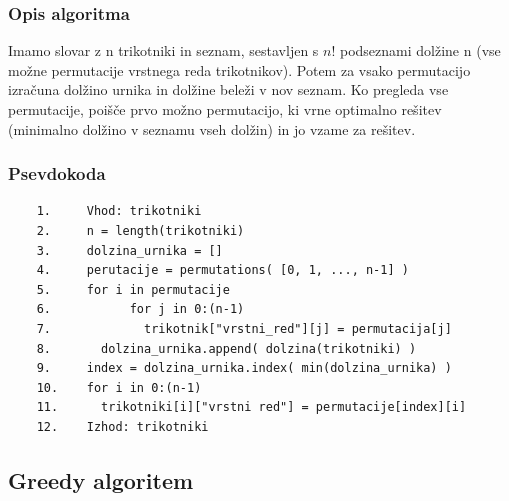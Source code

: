 \documentclass[a4paper,12pt]{article}
\theoremstyle{definition}
\theoremstyle{plain}
\begin{document}
\subsubsection{Opis algoritma}
Imamo slovar z n trikotniki in seznam, sestavljen s $n!$ podseznami dolžine n
(vse možne permutacije vrstnega reda trikotnikov). Potem za vsako permutacijo izračuna dolžino urnika in 
dolžine beleži v nov seznam. Ko pregleda vse permutacije, poišče prvo možno permutacijo, ki vrne optimalno rešitev
(minimalno dolžino v seznamu vseh dolžin) in jo vzame za rešitev.

\subsubsection{Psevdokoda}
\begin{verbatim}
    1.     Vhod: trikotniki
    2.     n = length(trikotniki)
    3.     dolzina_urnika = []
    4.     perutacije = permutations( [0, 1, ..., n-1] )
    5.     for i in permutacije
    6.           for j in 0:(n-1)
    7.             trikotnik["vrstni_red"][j] = permutacija[j]
    8.       dolzina_urnika.append( dolzina(trikotniki) )
    9.     index = dolzina_urnika.index( min(dolzina_urnika) )
    10.    for i in 0:(n-1)
    11.      trikotniki[i]["vrstni red"] = permutacije[index][i]
    12.    Izhod: trikotniki

\end{verbatim}




\subsection{Greedy algoritem}
\end{document}
